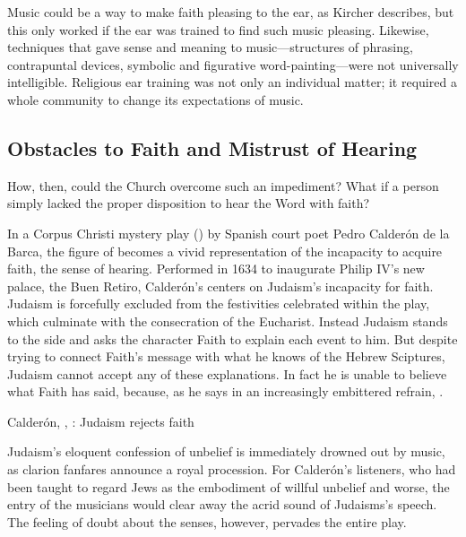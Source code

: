 Music could be a way to make faith pleasing to the ear, as Kircher  describes, but this only worked if the ear was trained to find such music pleasing.
Likewise, techniques that gave sense and meaning to music---structures of phrasing, contrapuntal devices, symbolic and figurative word-painting---were not universally intelligible.
Religious ear training was not only an individual matter; it required a whole community to change its expectations of music.


\subsection{Obstacles to Faith and Mistrust of Hearing}

How, then, could the Church overcome such an impediment?
What if a person simply lacked the proper disposition to hear the Word with faith?

In a Corpus Christi mystery play () by Spanish court poet Pedro Calderón de la Barca, the figure of  becomes a vivid representation of the incapacity to acquire faith,  the sense of hearing.
Performed in 1634 to inaugurate Philip IV's new palace, the Buen Retiro, Calderón's  centers on Judaism's incapacity for faith.%
\autocite{Calderon:Retiro}
Judaism is forcefully excluded from the festivities celebrated within the play, which culminate with the consecration of the Eucharist.
Instead Judaism stands to the side and asks the character Faith to explain each event to him.
But despite trying to connect Faith's message with what he knows of the Hebrew Sciptures, Judaism cannot accept any of these explanations.
In fact he is unable to believe what Faith has said, because, as he says in an increasingly embittered refrain, .

\begin{expoem}
  \caption{Calderón, , : Judaism rejects faith}
  \label{expoem:Calderon-Retiro-Judaismo}
\end{expoem}

Judaism's eloquent confession of unbelief is immediately drowned out by music, as clarion fanfares announce a royal procession.
For Calderón's listeners, who had been taught to regard Jews as the embodiment of willful unbelief and worse, the entry of the musicians would clear away the acrid sound of Judaisms's speech.
The feeling of doubt about the senses, however, pervades the entire play.

